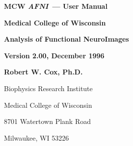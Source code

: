 
\newcommand{\afni}{{\it AFNI\,}}
\newcommand{\afnit}{{\it AFNI\/}\ }
\newcommand{\tothreed}{{\sf to3d\,}}
\newcommand{\tothreedit}{{\sf to3d\/}\ }
\newcommand{\MCW}{{\sf MCW}}

\setlength{\topmargin}{0.0in}
\setlength{\textheight}{9.02in}
\setlength{\textwidth}{6.5in}
\setlength{\oddsidemargin}{0.25in}
\setlength{\evensidemargin}{0.25in}


\def\mypleft{\footnotesize \MCW$\!$ \afnit 2.00}
\def\mypright{\scriptsize Dec 30, 1996}
\dashpage

\raggedbottom

\newcommand{\seeme}[1]%
{\marginpar{\raggedright%
$\star\star\star$\hspace*{0pt plus 1fill}$\longrightarrow$\\{}%
\scriptsize\bf#1}}

\newcommand{\blob}{\hspace*{1em}}

\setlength{\fboxsep}{1.3pt}
\setlength{\fboxrule}{0.6pt}
\newcommand{\button}[1]{\fbox{\tt #1}}

\newcommand{\mysec}[1]{%
\vspace{1.1in}\goodbreak\vspace{-1.09in}\section{#1}}

\newcommand{\mysubsec}[1]{%
\vspace{0.9in}\goodbreak\vspace{-0.89in}\subsection{#1}}

\newcommand{\mysubsubsec}[1]{%
\vspace{0.8in}\goodbreak\vspace{-0.8in}\subsubsection{#1}}


\thispagestyle{empty}

\vspace*{-0.2in}
\centerline{\LARGE\bf \MCW$\!$ \afnit --- User Manual}\vspace{1.8ex}
\centerline{\Large\bf Medical College of Wisconsin}\vspace{1ex}
\centerline{\Large\bf Analysis of Functional NeuroImages}\vspace{1ex}
\centerline{\large\bf Version 2.00, December 1996}\vspace{1.5ex}
\centerline{\bf Robert W. Cox, Ph.D.}\vspace{0.5ex}
\centerline{Biophysics Research Institute}
\centerline{Medical College of Wisconsin}
\centerline{8701 Watertown Plank Road}
\centerline{Milwaukee, WI 53226}\vspace{1ex}

